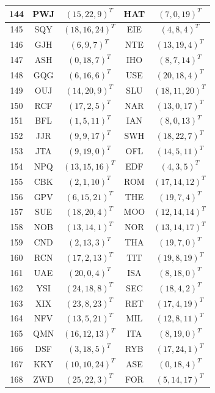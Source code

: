\begin{longtable}{|c|c|c|c|c|}
  \hline
  144 & PWJ & $(15, 22, 9)^T$ & HAT & $(7, 0, 19)^T$ \\
  \hline
  145 & SQY & $(18, 16, 24)^T$ & EIE & $(4, 8, 4)^T$ \\
  \hline
  146 & GJH & $(6, 9, 7)^T$ & NTE & $(13, 19, 4)^T$ \\
  \hline
  147 & ASH & $(0, 18, 7)^T$ & IHO & $(8, 7, 14)^T$ \\
  \hline
  148 & GQG & $(6, 16, 6)^T$ & USE & $(20, 18, 4)^T$ \\
  \hline
  149 & OUJ & $(14, 20, 9)^T$ & SLU & $(18, 11, 20)^T$ \\
  \hline
  150 & RCF & $(17, 2, 5)^T$ & NAR & $(13, 0, 17)^T$ \\
  \hline
  151 & BFL & $(1, 5, 11)^T$ & IAN & $(8, 0, 13)^T$ \\
  \hline
  152 & JJR & $(9, 9, 17)^T$ & SWH & $(18, 22, 7)^T$ \\
  \hline
  153 & JTA & $(9, 19, 0)^T$ & OFL & $(14, 5, 11)^T$ \\
  \hline
  154 & NPQ & $(13, 15, 16)^T$ & EDF & $(4, 3, 5)^T$ \\
  \hline
  155 & CBK & $(2, 1, 10)^T$ & ROM & $(17, 14, 12)^T$ \\
  \hline
  156 & GPV & $(6, 15, 21)^T$ & THE & $(19, 7, 4)^T$ \\
  \hline
  157 & SUE & $(18, 20, 4)^T$ & MOO & $(12, 14, 14)^T$ \\
  \hline
  158 & NOB & $(13, 14, 1)^T$ & NOR & $(13, 14, 17)^T$ \\
  \hline
  159 & CND & $(2, 13, 3)^T$ & THA & $(19, 7, 0)^T$ \\
  \hline
  160 & RCN & $(17, 2, 13)^T$ & TIT & $(19, 8, 19)^T$ \\
  \hline
  161 & UAE & $(20, 0, 4)^T$ & ISA & $(8, 18, 0)^T$ \\
  \hline
  162 & YSI & $(24, 18, 8)^T$ & SEC & $(18, 4, 2)^T$ \\
  \hline
  163 & XIX & $(23, 8, 23)^T$ & RET & $(17, 4, 19)^T$ \\
  \hline
  164 & NFV & $(13, 5, 21)^T$ & MIL & $(12, 8, 11)^T$ \\
  \hline
  165 & QMN & $(16, 12, 13)^T$ & ITA & $(8, 19, 0)^T$ \\
  \hline
  166 & DSF & $(3, 18, 5)^T$ & RYB & $(17, 24, 1)^T$ \\
  \hline
  167 & KKY & $(10, 10, 24)^T$ & ASE & $(0, 18, 4)^T$ \\
  \hline
  168 & ZWD & $(25, 22, 3)^T$ & FOR & $(5, 14, 17)^T$ \\

\end{longtable}
